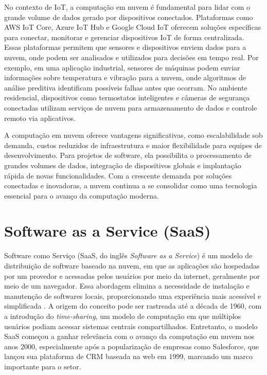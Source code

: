 No contexto de IoT, a computação em nuvem é fundamental para lidar com o grande volume de dados gerado por dispositivos conectados. Plataformas como AWS IoT Core, Azure IoT Hub e Google Cloud IoT oferecem soluções específicas para conectar, monitorar e gerenciar dispositivos IoT de forma centralizada. Essas plataformas permitem que sensores e dispositivos enviem dados para a nuvem, onde podem ser analisados e utilizados para decisões em tempo real. Por exemplo, em uma aplicação industrial, sensores de máquinas podem enviar informações sobre temperatura e vibração para a nuvem, onde algoritmos de análise preditiva identificam possíveis falhas antes que ocorram. No ambiente residencial, dispositivos como termostatos inteligentes e câmeras de segurança conectadas utilizam serviços de nuvem para armazenamento de dados e controle remoto via aplicativos.

A computação em nuvem oferece vantagens significativas, como escalabilidade sob demanda, custos reduzidos de infraestrutura e maior flexibilidade para equipes de desenvolvimento. Para projetos de software, ela possibilita o processamento de grandes volumes de dados, integração de dispositivos globais e implantação rápida de novas funcionalidades. Com a crescente demanda por soluções conectadas e inovadoras, a nuvem continua a se consolidar como uma tecnologia essencial para o avanço da computação moderna.

\section{Software as a Service (SaaS)}

Software como Serviço (\acrshort{SaaS}, do inglês \textit{Software as a Service}) é um modelo de distribuição de software baseado na nuvem, em que as aplicações são hospedadas por um provedor e acessadas pelos usuários por meio da internet, geralmente por meio de um navegador. Essa abordagem elimina a necessidade de instalação e manutenção de softwares locais, proporcionando uma experiência mais acessível e simplificada \cite{1236470}. A origem do conceito pode ser rastreada até a década de 1960, com a introdução do \textit{time-sharing}, um modelo de computação em que múltiplos usuários podiam acessar sistemas centrais compartilhados. Entretanto, o modelo SaaS começou a ganhar relevância com o avanço da computação em nuvem nos anos 2000, especialmente após a popularização de empresas como Salesforce, que lançou sua plataforma de \acrfull{CRM} baseada na web em 1999, marcando um marco importante para o setor.

